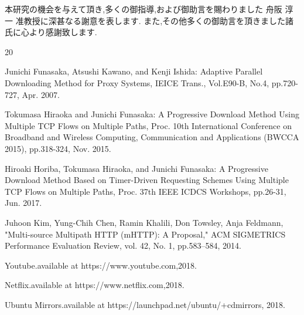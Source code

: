 \documentclass[a4j,12pt]{gradthesis_utf8}
\begin{document}
\clearpage
%
\begin{acknowledgment}
 本研究の機会を与えて頂き,多くの御指導,および御助言を賜わりました
舟阪 淳一 准教授に深甚なる謝意を表します.
また,その他多くの御助言を頂きました諸氏に心より感謝致します.
\end{acknowledgment}
\begin {thebibliography}{20} 

Junichi Funasaka, Atsushi Kawano, and Kenji Ishida: Adaptive Parallel Downloading Method for Proxy Systems, IEICE Trans., Vol.E90-B, No.4, pp.720-727, Apr. 2007.

Tokumasa Hiraoka and Junichi Funasaka: A Progressive Download Method Using Multiple TCP Flows on Multiple Paths, Proc. 10th International Conference on Broadband and Wireless Computing, Communication and Applications (BWCCA 2015), pp.318-324, Nov. 2015. 

Hiroaki Horiba, Tokumasa Hiraoka, and Junichi Funasaka: A Progressive Download Method Based on Timer-Driven Requesting Schemes Using Multiple TCP Flows on Multiple Paths, Proc. 37th IEEE ICDCS Workshops, pp.26-31, Jun. 2017.

Juhoon Kim, Yung-Chih Chen, Ramin Khalili, Don Towsley, Anja Feldmann,
"Multi-source Multipath HTTP (mHTTP): A Proposal,"
ACM SIGMETRICS Performance Evaluation Review, vol. 42, No. 1, pp.583--584, 2014.

Youtube.available at https://www.youtube.com,2018.

Netflix.available at https://www.netflix.com,2018.

Ubuntu Mirrors.available at https://launchpad.net/ubuntu/+cdmirrors, 2018.

\end {thebibliography}
\end{document}
